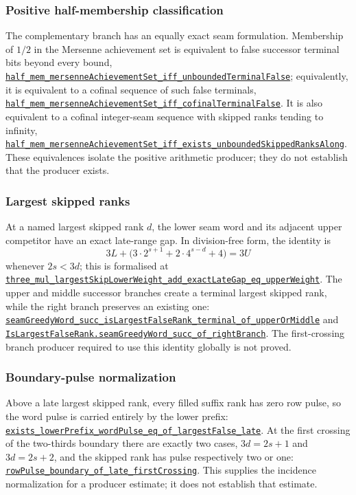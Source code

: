 \documentclass[11pt]{article}
\newcommand{\commit}{81150c1c6fdd4cd51e76d3aa0de344341e0e9e7c}
\newcommand{\repobase}{https://github.com/wcook04/plectis-lean-erdos249-257/blob/\commit}
\newcommand{\PK}{Erdos249257}
\newcommand{\lref}[3]{\href{\repobase/\PK/#1\#L#2}{\nolinkurl{#3}}}
\newcommand{\lrefx}[3]{\href{\repobase/\PK/#1\#L#2}{\nolinkurl{#3}}}
\theoremstyle{definition}
\theoremstyle{remark}
\begin{document}
\subsubsection{Positive half-membership classification}\label{res:halfmembership}

The complementary branch has an equally exact seam formulation.  Membership
of $1/2$ in the Mersenne achievement set is equivalent to false successor
terminal bits beyond every bound,
\lref{HalfCylinderHalfMembershipClassification.lean}{126}{half_mem_mersenneAchievementSet_iff_unboundedTerminalFalse};
equivalently, it is equivalent to a cofinal sequence of such false terminals,
\lrefx{HalfCylinderHalfMembershipClassification.lean}{203}{half_mem_mersenneAchievementSet_iff_cofinalTerminalFalse}.
It is also equivalent to a cofinal integer-seam sequence with skipped ranks
tending to infinity,
\lrefx{HalfCylinderHalfMembershipClassification.lean}{213}{half_mem_mersenneAchievementSet_iff_exists_unboundedSkippedRanksAlong}.
These equivalences isolate the positive arithmetic producer; they do not
establish that the producer exists.

\subsubsection{Largest skipped ranks}\label{res:largestskip}

At a named largest skipped rank $d$, the lower seam word and its adjacent
upper competitor have an exact late-range gap.  In division-free form, the
identity is
\[
  3L+\bigl(3\cdot2^{s+1}+2\cdot4^{s-d}+4\bigr)=3U
\]
whenever $2s<3d$; this is formalised at
\lref{HalfCylinderLargestSkipGap.lean}{259}{three_mul_largestSkipLowerWeight_add_exactLateGap_eq_upperWeight}.
The upper and middle successor branches create a terminal largest skipped
rank, while the right branch preserves an existing one:
\lrefx{HalfCylinderLargestSkipGap.lean}{328}{seamGreedyWord_succ_isLargestFalseRank_terminal_of_upperOrMiddle}
and
\lrefx{HalfCylinderLargestSkipGap.lean}{339}{IsLargestFalseRank.seamGreedyWord_succ_of_rightBranch}.
The first-crossing branch producer required to use this identity globally is
not proved.

\subsubsection{Boundary-pulse normalization}\label{res:boundarypulse}

Above a late largest skipped rank, every filled suffix rank has zero row
pulse, so the word pulse is carried entirely by the lower prefix:
\lref{HalfCylinderBoundaryPulse.lean}{85}{exists_lowerPrefix_wordPulse_eq_of_largestFalse_late}.
At the first crossing of the two-thirds boundary there are exactly two cases,
$3d=2s+1$ and $3d=2s+2$, and the skipped rank has pulse respectively two or
one:
\lrefx{HalfCylinderBoundaryPulse.lean}{150}{rowPulse_boundary_of_late_firstCrossing}.
This supplies the incidence normalization for a producer estimate; it does
not establish that estimate.
\end{document}

